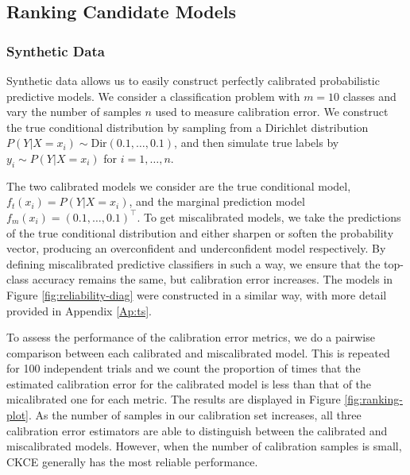 \documentclass[twocolumn]{article}
\theoremstyle{definition}
\begin{document}
\subsection{Ranking Candidate Models}


\subsubsection{Synthetic Data} \label{sec:experiments_1}

Synthetic data allows us to easily construct perfectly calibrated probabilistic predictive models. We consider a classification problem with $m = 10$ classes and vary the number of samples $n$ used to measure calibration error. We construct the true conditional distribution by sampling from a Dirichlet distribution $P(Y | X = x_i) \sim \text{Dir}(0.1, \dots, 0.1)$, and then simulate true labels by $y_i \sim P(Y | X = x_i)$ for $i = 1, \dots, n$.

The two calibrated models we consider are the true conditional model, $f_t(x_i) = P(Y|X = x_i)$, and the marginal prediction model $f_m(x_i) = (0.1, \dots, 0.1)^\top$. To get miscalibrated models, we take the predictions of the true conditional distribution and either sharpen or soften the probability vector, producing an overconfident and underconfident model respectively. By defining miscalibrated predictive classifiers in such a way, we ensure that the top-class accuracy remains the same, but calibration error increases. The models in Figure \ref{fig:reliability-diag} were constructed in a similar way, with more detail provided in Appendix \ref{Ap:ts}. 

To assess the performance of the calibration error metrics, we do a pairwise comparison between each calibrated and miscalibrated model. This is repeated for 100 independent trials and we count the proportion of times that the estimated calibration error for the calibrated model is less than that of the micalibrated one for each metric. The results are displayed in Figure \ref{fig:ranking-plot}. As the number of samples in our calibration set increases, all three calibration error estimators are able to distinguish between the calibrated and miscalibrated models. However, when the number of calibration samples is small, CKCE generally has the most reliable performance. 
\end{document}
